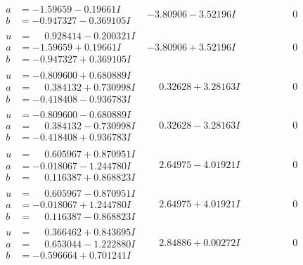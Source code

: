 \documentclass[1p]{elsarticle_modified}
\theoremstyle{definition}
\begin{document}
$$\begin{array}{c|c|c}
\begin{aligned}
a &= -1.59659 - 0.19661 I \\
b &= -0.947327 - 0.369105 I\end{aligned}
 & -3.80906 - 3.52196 I & \phantom{-0.000000 } 0 \\ \hline\begin{aligned}
u &= \phantom{-}0.928414 - 0.200321 I \\
a &= -1.59659 + 0.19661 I \\
b &= -0.947327 + 0.369105 I\end{aligned}
 & -3.80906 + 3.52196 I & \phantom{-0.000000 } 0 \\ \hline\begin{aligned}
u &= -0.809600 + 0.680889 I \\
a &= \phantom{-}0.384132 + 0.730998 I \\
b &= -0.418408 - 0.936783 I\end{aligned}
 & \phantom{-}0.32628 + 3.28163 I & \phantom{-0.000000 } 0 \\ \hline\begin{aligned}
u &= -0.809600 - 0.680889 I \\
a &= \phantom{-}0.384132 - 0.730998 I \\
b &= -0.418408 + 0.936783 I\end{aligned}
 & \phantom{-}0.32628 - 3.28163 I & \phantom{-0.000000 } 0 \\ \hline\begin{aligned}
u &= \phantom{-}0.605967 + 0.870951 I \\
a &= -0.018067 - 1.244780 I \\
b &= \phantom{-}0.116387 + 0.868823 I\end{aligned}
 & \phantom{-}2.64975 - 4.01921 I & \phantom{-0.000000 } 0 \\ \hline\begin{aligned}
u &= \phantom{-}0.605967 - 0.870951 I \\
a &= -0.018067 + 1.244780 I \\
b &= \phantom{-}0.116387 - 0.868823 I\end{aligned}
 & \phantom{-}2.64975 + 4.01921 I & \phantom{-0.000000 } 0 \\ \hline\begin{aligned}
u &= \phantom{-}0.366462 + 0.843695 I \\
a &= \phantom{-}0.653044 - 1.222880 I \\
b &= -0.596664 + 0.701241 I\end{aligned}
 & \phantom{-}2.84886 + 0.00272 I & \phantom{-0.000000 } 0 \\ \hline\begin{aligned}

\end{aligned}
\end{array}$$
\end{document}
